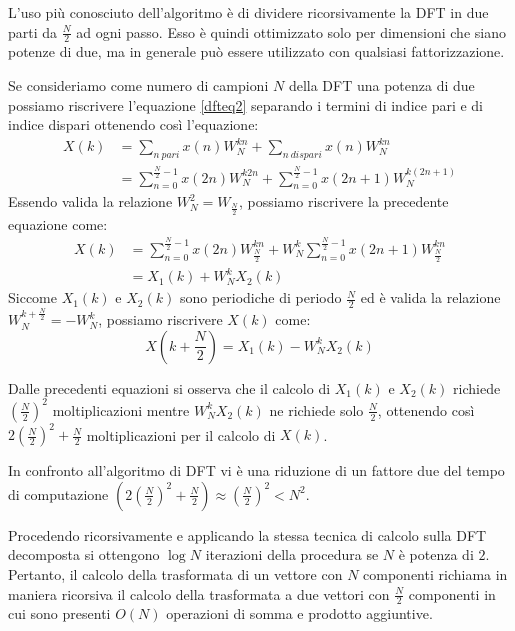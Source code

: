 L'uso più conosciuto dell'algoritmo è di dividere ricorsivamente la DFT in due parti da $\frac{N}{2}$ ad ogni passo. Esso è quindi ottimizzato solo per dimensioni che siano potenze di due, ma in generale può essere utilizzato con qualsiasi fattorizzazione.

Se consideriamo come numero di campioni $N$ della DFT una potenza di due possiamo riscrivere l'equazione \ref{dfteq2} separando i termini di indice pari e di indice dispari ottenendo così l'equazione:
\begin{equation}
\begin{split}
	X(k) &= \sum_{n\ pari} x(n)W_{N}^{kn} + \sum_{n\ dispari} x(n)W_{N}^{kn} \\
	&= \sum_{n=0}^{\frac{N}{2}-1} x(2n)W_{N}^{k2n} + \sum_{n=0}^{\frac{N}{2}-1} x(2n+1)W_{N}^{k(2n+1)}
\end{split}
\end{equation}
Essendo valida la relazione $W_N^2=W_{\frac{N}{2}}$, possiamo riscrivere la precedente equazione come:
\begin{equation}
\begin{split}
	X(k) &= \sum_{n=0}^{\frac{N}{2}-1} x(2n)W_{\frac{N}{2}}^{kn} + W_N^k \sum_{n=0}^{\frac{N}{2}-1} x(2n+1)W_{\frac{N}{2}}^{kn}\\
	&= X_1(k) + W_N^k X_2(k)
	\end{split}
\end{equation}
Siccome $X_1(k)$ e $X_2(k)$ sono periodiche di periodo $\frac{N}{2}$ ed è valida la relazione $W_N^{k + \frac{N}{2}}=-W_N^k$, possiamo riscrivere $X(k)$ come:
\begin{equation}
	X \left ( k+\frac{N}{2} \right ) =X_1(k) - W_N^k X_2(k)
\end{equation}

Dalle precedenti equazioni si osserva che il calcolo di $X_1(k)$ e $X_2(k)$ richiede $ \left ( \frac{N}{2} \right ) ^2$ moltiplicazioni mentre $W_N^k X_2(k)$ ne richiede solo $\frac{N}{2}$, ottenendo così $2 \left ( \frac{N}{2} \right ) ^2 + \frac{N}{2}$ moltiplicazioni per il calcolo di $X(k)$.

In confronto all'algoritmo di DFT vi è una riduzione di un fattore due del tempo di computazione $\left ( 2 \left ( \frac{N}{2} \right ) ^2 + \frac{N}{2} \right ) \approx \left ( \frac{N}{2} \right ) ^2  < N^2 $. 

Procedendo ricorsivamente e applicando la stessa tecnica di calcolo sulla DFT decomposta si ottengono $\log N$ iterazioni della procedura se $N$ è potenza di $2$. 
Pertanto, il calcolo della trasformata di un vettore con $N$ componenti richiama in maniera ricorsiva il calcolo della trasformata a due vettori con $\frac{N}{2}$ componenti in cui sono presenti $O(N)$ operazioni di somma e prodotto aggiuntive.  

